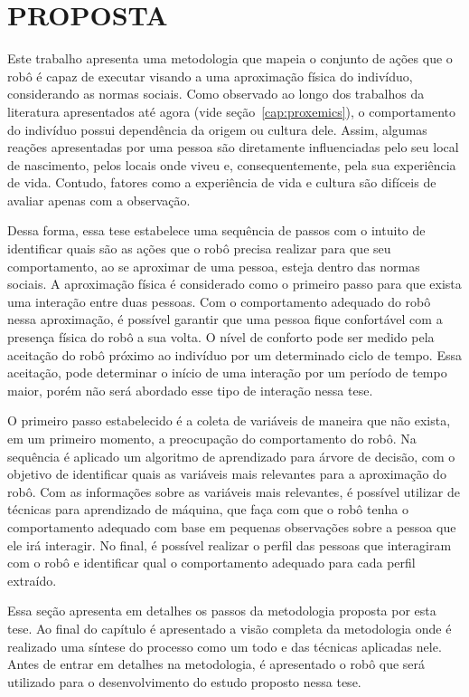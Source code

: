 \chapter{PROPOSTA}
\label{cap:proposta}

Este trabalho apresenta uma metodologia que mapeia o conjunto de ações que o robô é capaz de executar visando a uma aproximação física do indivíduo, considerando as normas sociais. Como observado ao longo dos trabalhos da literatura apresentados até agora (vide seção~\ref{cap:proxemics}), o comportamento do indivíduo possui dependência da origem ou cultura dele. Assim, algumas reações apresentadas por uma pessoa são diretamente influenciadas pelo seu local de nascimento, pelos locais onde viveu e, consequentemente, pela sua experiência de vida. Contudo, fatores como a experiência de vida e cultura são difíceis de avaliar apenas com a observação.

Dessa forma, essa tese estabelece uma sequência de passos com o intuito de identificar quais são as ações que o robô precisa realizar para que seu comportamento, ao se aproximar de uma pessoa, esteja dentro das normas sociais. A aproximação física é considerado como o primeiro passo para que exista uma interação entre duas pessoas. Com o comportamento adequado do robô nessa aproximação, é possível garantir que uma pessoa fique confortável com a presença física do robô a sua volta. O nível de conforto pode ser medido pela aceitação do robô próximo ao indivíduo por um determinado ciclo de tempo. Essa aceitação, pode determinar o início de uma interação por um período de tempo maior, porém não será abordado esse tipo de interação nessa tese.

O primeiro passo estabelecido é a coleta de variáveis de maneira que não exista, em um primeiro momento, a preocupação do comportamento do robô. Na sequência é aplicado um algoritmo de aprendizado para árvore de decisão, com o objetivo de identificar quais as variáveis mais relevantes para a aproximação do robô. Com as informações sobre as variáveis mais relevantes, é possível utilizar de técnicas para aprendizado de máquina, que faça com que o robô tenha o comportamento adequado com base em pequenas observações sobre a pessoa que ele irá interagir. No final, é possível realizar o perfil das pessoas que interagiram com o robô e identificar qual o comportamento adequado para cada perfil extraído.

Essa seção apresenta em detalhes os passos da metodologia proposta por esta tese. Ao final do capítulo é apresentado a visão completa da metodologia onde é realizado uma síntese do processo como um todo e das técnicas aplicadas nele. Antes de entrar em detalhes na metodologia, é apresentado o robô que será utilizado para o desenvolvimento do estudo proposto nessa tese.

